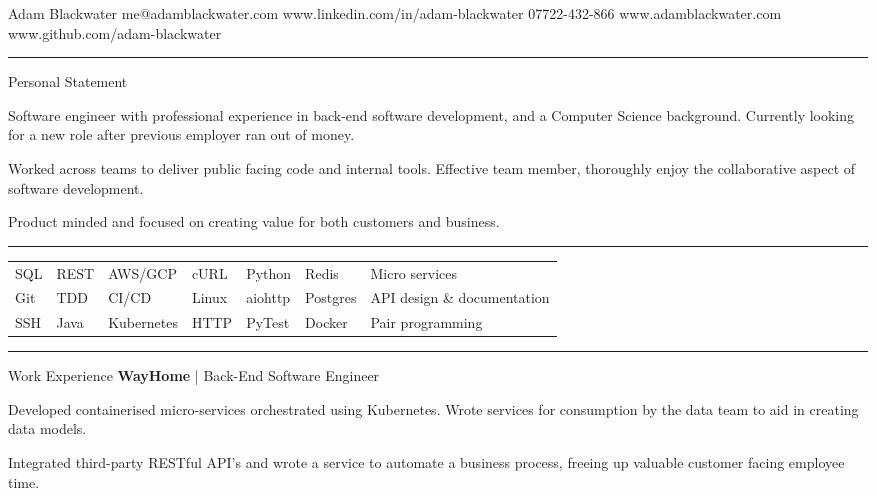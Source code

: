 \documentclass[12pt,twoside]{article}
\begin{document}
\topheading
    {Adam Blackwater}
    {me@adamblackwater.com }
    {www.linkedin.com/in/adam-blackwater}
    {07722-432-866}
    {www.adamblackwater.com}
    {www.github.com/adam-blackwater}

\vspace{0.6em}
\hrule
\vspace{0.6em}

\statement
    {Personal Statement}
    {
        Software engineer with professional experience in back-end software
        development, and a Computer Science background. Currently looking for a
        new role after previous employer ran out of money.

        \hspace{1.5em}Worked across teams to deliver public facing code and
        internal tools. Effective team member, thoroughly enjoy the
        collaborative aspect of software development.

        \hspace{1.5em}Product minded and focused on creating value for both
        customers and business.
    }

\vspace{0.8em}
\hrule
\vspace{0.8em}

\begin{center}
    \begin{tabular}{l l l l l l l}
        SQL & REST & AWS/GCP & cURL & Python & Redis & Micro services \\
        Git & TDD & CI/CD & Linux & aiohttp & Postgres & API design \& documentation \\
        SSH & Java & Kubernetes & HTTP & PyTest& Docker & Pair programming
    \end{tabular}
\end{center}

\hrule
\vspace{0.8em}

\headedsection
    {Work Experience}
    {
        \textbf{WayHome} | Back-End Software Engineer}
    {
        Developed containerised micro-services orchestrated using Kubernetes. Wrote
        services for consumption by the data team to aid in creating data models.

        \hspace{1.5em}Integrated third-party RESTful API's and wrote a service to
        automate a business process, freeing up valuable customer facing
        employee time.
    }
\end{document}
